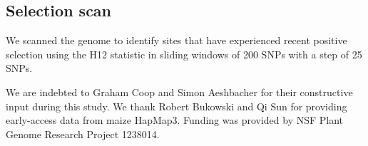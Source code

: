 \documentclass{pnastwo}
\begin{document}
\begin{article}
\begin{materials}
\subsection{Selection scan}
We scanned the genome to identify sites that have experienced recent positive selection using the H12 statistic \cite{garud2015} in sliding windows of 200 SNPs with a step of 25 SNPs.


\end{materials}

\begin{acknowledgments}
We are indebted to Graham Coop and Simon Aeshbacher for their constructive input during this study. We thank Robert Bukowski and Qi Sun for providing early-access data from maize HapMap3. Funding was provided by NSF Plant Genome Research Project 1238014.
\end{acknowledgments}



\onecolumn
 


\end{article}
\end{document}
